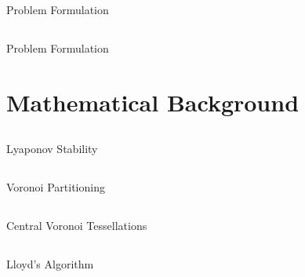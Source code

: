 \documentclass[t]{beamer}
\begin{document}
\subsection[Problem Formulation]{}
\begin{frame}[label=sl1]{Problem Formulation}

\end{frame}

\subsection[Literature Review]{}
\begin{frame}[label=sl1]{Problem Formulation}

\end{frame}


\section[Mathematical Background]{Mathematical Background}
\subsection[Lyaponov Stability]{}
\begin{frame}[label=sl2]{Lyaponov Stability}

\end{frame}

\subsection[Voronoi Partitioning]{}
\begin{frame}[label=sl2]{Voronoi Partitioning}

\end{frame}

\subsection[Voronoi Partitioning]{}
\begin{frame}[label=sl2]{Central Voronoi Tessellations}

\end{frame}

\subsection[Voronoi Partitioning]{}
\begin{frame}[label=sl2]{Lloyd's Algorithm}

\end{frame}
\end{document}
